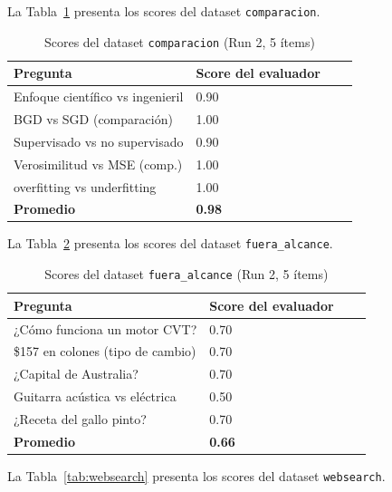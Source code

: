 \documentclass[conference]{IEEEtran}
\begin{document}
La Tabla~\ref{tab:comparacion} presenta los scores del dataset \texttt{comparacion}.

\begin{table}[htbp]
\caption{Scores del dataset \texttt{comparacion} (Run 2, 5 ítems)}
\label{tab:comparacion}
\centering
\begin{tabular}{p{3.5cm}p{3.2cm}p{1.1cm}p{1.1cm}}
\toprule
\textbf{Pregunta} & \textbf{Score del evaluador} \\
\midrule
Enfoque científico vs ingenieril  & 0.90 \\
BGD vs SGD (comparación)          & 1.00 \\
Supervisado vs no supervisado     & 0.90 \\
Verosimilitud vs MSE (comp.)      & 1.00 \\
overfitting vs underfitting       & 1.00 \\
\midrule
\textbf{Promedio}                 & \textbf{0.98} \\
\bottomrule
\end{tabular}
\end{table}

La Tabla~\ref{tab:fuera} presenta los scores del dataset \texttt{fuera\_alcance}.

\begin{table}[htbp]
\caption{Scores del dataset \texttt{fuera\_alcance} (Run 2, 5 ítems)}
\label{tab:fuera}
\centering
\begin{tabular}{p{3.5cm}p{3.2cm}p{1.1cm}p{1.1cm}}
\toprule
\textbf{Pregunta} & \textbf{Score del evaluador} \\
\midrule
¿Cómo funciona un motor CVT?      & 0.70 \\
\$157 en colones (tipo de cambio) & 0.70 \\
¿Capital de Australia?            & 0.70 \\
Guitarra acústica vs eléctrica    & 0.50 \\
¿Receta del gallo pinto?          & 0.70 \\
\midrule
\textbf{Promedio}                 & \textbf{0.66} \\
\bottomrule
\end{tabular}
\end{table}

La Tabla~\ref{tab:websearch} presenta los scores del dataset \texttt{websearch}.
\end{document}
